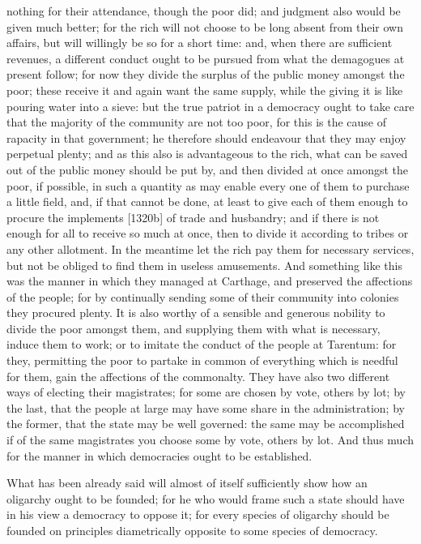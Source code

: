 nothing for their attendance, though the poor did; and judgment also would
be given much better; for the rich will not choose to be long absent from
their own affairs, but will willingly be so for a short time: and, when
there are sufficient revenues, a different conduct ought to be pursued
from what the demagogues at present follow; for now they divide the
surplus of the public money amongst the poor; these receive it and again
want the same supply, while the giving it is like pouring water into a
sieve: but the true patriot in a democracy ought to take care that the
majority of the community are not too poor, for this is the cause of
rapacity in that government; he therefore should endeavour that they may
enjoy perpetual plenty; and as this also is advantageous to the rich, what
can be saved out of the public money should be put by, and then divided at
once amongst the poor, if possible, in such a quantity as may enable every
one of them to purchase a little field, and, if that cannot be done, at
least to give each of them enough to procure the implements [1320b] of
trade and husbandry; and if there is not enough for all to receive so much
at once, then to divide it according to tribes or any other allotment. In
the meantime let the rich pay them for necessary services, but not be
obliged to find them in useless amusements. And something like this was
the manner in which they managed at Carthage, and preserved the affections
of the people; for by continually sending some of their community into
colonies they procured plenty. It is also worthy of a sensible and
generous nobility to divide the poor amongst them, and supplying them with
what is necessary, induce them to work; or to imitate the conduct of the
people at Tarentum: for they, permitting the poor to partake in common of
everything which is needful for them, gain the affections of the
commonalty. They have also two different ways of electing their
magistrates; for some are chosen by vote, others by lot; by the last, that
the people at large may have some share in the administration; by the
former, that the state may be well governed: the same may be accomplished
if of the same magistrates you choose some by vote, others by lot. And
thus much for the manner in which democracies ought to be established.


What has been already said will almost of itself sufficiently show how an
oligarchy ought to be founded; for he who would frame such a state should
have in his view a democracy to oppose it; for every species of oligarchy
should be founded on principles diametrically opposite to some species of
democracy.

